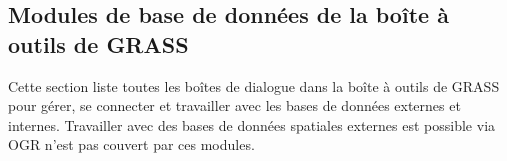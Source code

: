 \subsection{Modules de base de donn\'ees de la bo\^ite \`a outils de GRASS}

Cette section liste toutes les bo\^ites de dialogue dans la bo\^ite \`a outils de GRASS pour g\'erer, se connecter et travailler avec les bases de donn\'ees externes et internes. Travailler avec des bases de donn\'ees spatiales externes est possible via OGR n'est pas couvert par ces modules.

